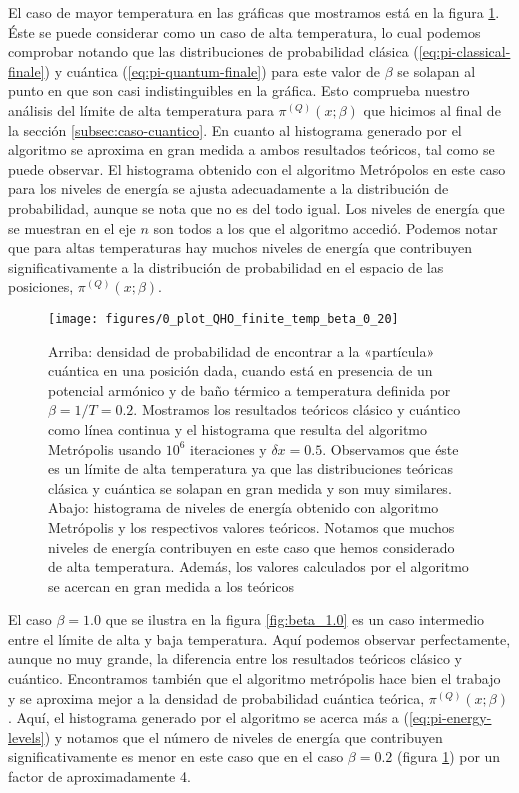 \documentclass[%
 reprint,
 amsmath,amssymb,
 aps,
 pra,
]{revtex4-2}
\begin{document}
El caso de mayor temperatura en las gráficas que mostramos está en la figura \ref{fig:beta_0.2}. Éste se puede considerar como un caso de alta temperatura, lo cual podemos comprobar notando que las distribuciones de probabilidad clásica (\ref{eq:pi-classical-finale}) y cuántica (\ref{eq:pi-quantum-finale}) para este valor de $\beta$ se solapan al punto en que son casi indistinguibles en la gráfica. Esto comprueba nuestro análisis del límite de alta temperatura para $\pi^{(Q)}(x;\beta)$ que hicimos al final de la sección \ref{subsec:caso-cuantico}. En cuanto al histograma generado por el algoritmo se aproxima en gran medida a ambos resultados teóricos, tal como se puede observar. El histograma obtenido con el algoritmo Metrópolos en este caso para los niveles de energía se ajusta adecuadamente a la distribución de probabilidad, aunque se nota que no es del todo igual. Los niveles de energía que se muestran en el eje $n$ son todos a los que el algoritmo accedió. Podemos notar que para altas temperaturas hay muchos niveles de energía que contribuyen significativamente a la distribución de probabilidad en el espacio de las posiciones, $\pi^{(Q)}(x;\beta)$.

\begin{figure}[t]
	\centering
	\texttt{[image: figures/0\_plot\_QHO\_finite\_temp\_beta\_0\_20]}
	\caption{Arriba: densidad de probabilidad de encontrar a la «partícula» cuántica en una posición dada, cuando está en presencia de un potencial armónico y de baño térmico a temperatura definida por $\beta=1/T=0.2$. Mostramos los resultados teóricos clásico y cuántico como línea continua y el histograma que resulta del algoritmo Metrópolis usando $10^6$ iteraciones y $\delta x = 0.5$. Observamos que éste es un límite de alta temperatura ya que las distribuciones teóricas clásica y cuántica se solapan en gran medida y son muy similares. Abajo: histograma de niveles de energía obtenido con algoritmo Metrópolis y los respectivos valores teóricos. Notamos que muchos niveles de energía contribuyen en este caso que hemos considerado de alta temperatura. Además, los valores calculados por el algoritmo se acercan en gran medida a los teóricos}
	\label{fig:beta_0.2}
\end{figure}

El caso $\beta=1.0$ que se ilustra en la figura \ref{fig:beta_1.0} es un caso intermedio entre el límite de alta y baja temperatura. Aquí podemos observar perfectamente, aunque no muy grande, la diferencia entre los resultados teóricos clásico y cuántico. Encontramos también que el algoritmo metrópolis hace bien el trabajo y se aproxima mejor a la densidad de probabilidad cuántica teórica, $\pi^{(Q)}(x;\beta)$. Aquí, el histograma generado por el algoritmo se acerca más a (\ref{eq:pi-energy-levels}) y notamos que el número de niveles de energía que contribuyen significativamente es menor en este caso que en el caso $\beta=0.2$ (figura \ref{fig:beta_0.2}) por un factor de aproximadamente 4.
\end{document}
